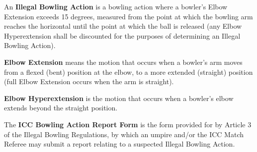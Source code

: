 \documentclass[12pt]{article}
\begin{document}
\vspace{\baselineskip}
\begin{adjustwidth}{0.4in}{0.19in}
{\fontsize{9pt}{10.8pt} \tabto{0.39in} An \textbf{Illegal Bowling Action} is a bowling action where a bowler’s Elbow Extension exceeds 15 degrees, measured from the point at which the bowling arm reaches the horizontal until the point at which the ball is released (any Elbow Hyperextension shall be discounted for the purposes of determining an Illegal Bowling Action).\par}\par

\end{adjustwidth}


\vspace{\baselineskip}
\begin{adjustwidth}{0.4in}{0.12in}
{\fontsize{9pt}{10.8pt} \tabto{0.39in} \textbf{Elbow Extension }means the motion that occurs when a bowler's arm moves from a flexed (bent) position at\textbf{ }the elbow, to a more extended (straight) position (full Elbow Extension occurs when the arm is straight).\par}\par

\end{adjustwidth}


\vspace{\baselineskip}
{\fontsize{9pt}{10.8pt} \tabto{0.39in} {\fontsize{8pt}{9.6pt}\selectfont \textbf{Elbow Hyperextension }is the motion that occurs when a bowler's elbow extends beyond the straight position.\par}\par}\par


\vspace{\baselineskip}
\begin{adjustwidth}{0.4in}{0.03in}
\begin{justify}
{\fontsize{9pt}{10.8pt} \tabto{0.39in} The \textbf{ICC Bowling Action Report Form} is the form provided for by Article 3 of the Illegal Bowling Regulations, by which an umpire and/or the ICC Match Referee may submit a report relating to a suspected Illegal Bowling Action.\par}
\end{justify}\par

\end{adjustwidth}
\end{document}
